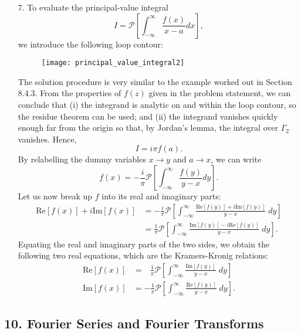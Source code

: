 \documentclass[10pt,a4paper]{article}
\begin{document}
\begin{enumerate}
\item[7.]
To evaluate the principal-value integral
\begin{equation}
  I = \mathcal{P}\left[\int_{-\infty}^\infty \frac{f(x)}{x-a} dx \right],
\end{equation}
we introduce the following loop contour:

\begin{figure}[ht]
  \centering\texttt{[image: principal\_value\_integral2]}
\end{figure}

The solution procedure is very similar to the example worked out in
Section 8.4.3. From the properties of $f(z)$ given in the problem
statement, we can conclude that (i) the integrand is analytic on and
within the loop contour, so the residue theorem can be used; and (ii)
the integrand vanishes quickly enough far from the origin so that, by
Jordan's lemma, the integral over $\Gamma_2$ vanishes. Hence,
\begin{equation}
  I = i \pi f(a).
\end{equation}
 By relabelling the dummy variables
$x \rightarrow y$ and $a \rightarrow x$, we can write
\begin{equation}
  f(x) = -\frac{i}{\pi} \mathcal{P}\left[\int_{-\infty}^\infty \frac{f(y)}{y-x} dy \right].
\end{equation}
Let us now break up $f$ into its real and imaginary parts:
\begin{align}
  \mathrm{Re}[f(x)] + i \mathrm{Im}[f(x)]
  &= -\frac{i}{\pi} \mathcal{P}\left[\int_{-\infty}^\infty \frac{\mathrm{Re}[f(y)] + i \mathrm{Im}[f(y)]}{y-x} \;dy \right] \\
  &= \frac{1}{\pi} \mathcal{P}\left[\int_{-\infty}^\infty \frac{\mathrm{Im}[f(y)] -i\mathrm{Re}[f(y)]}{y-x} \;dy \right].
\end{align}
Equating the real and imaginary parts of the two sides, we obtain the
following two real equations, which are the Kramers-Kronig relations:
\begin{align}
  \mathrm{Re}[f(x)] &= \;\;\,\frac{1}{\pi} \mathcal{P}\left[\int_{-\infty}^\infty \frac{\mathrm{Im}[f(y)]}{y-x} \;dy \right] \\
  \mathrm{Im}[f(x)] &= -\frac{1}{\pi} \mathcal{P}\left[\int_{-\infty}^\infty \frac{\mathrm{Re}[f(y)]}{y-x} \; dy \right].
\end{align}

\end{enumerate}

\subsection*{10. Fourier Series and Fourier Transforms}
\end{document}
